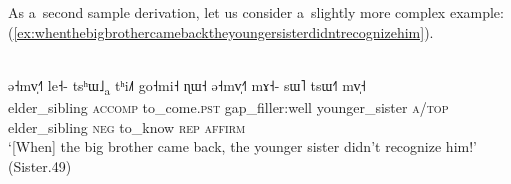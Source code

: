 %
%
%
%
%
As a~second sample derivation, let us consider a~slightly more complex example:  (\ref{ex:whenthebigbrothercamebacktheyoungersisterdidntrecognizehim}).

\label{sec:anentiresentencesister49}

\begin{exe}
  \ex
  \label{ex:whenthebigbrothercamebacktheyoungersisterdidntrecognizehim}
  \\
  \gll ə˧mv̩˧˥		le˧-		tsʰɯ˩\textsubscript{a}	tʰi˩˥		go˧mi˧ ɳɯ˧	ə˧mv̩˧˥		mɤ˧-	sɯ˥		tsɯ˧˥	mv̩˧\\
  elder\_sibling	\textsc{accomp}	to\_come.\textsc{pst}	gap\_filler:well	younger\_sister
  \textsc{a}/\textsc{top}
  elder\_sibling	\textsc{neg}	to\_know	\textsc{rep}	\textsc{affirm}\\
  \glt ‘[When] the big brother came back, the younger sister didn’t recognize him!’ (Sister.49)
\end{exe}

